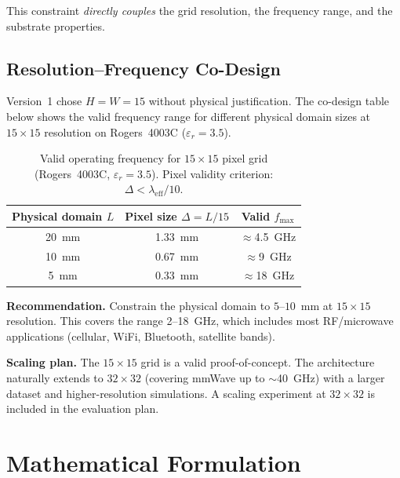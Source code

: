 \documentclass[12pt,a4paper]{article}
\newcommand{\NOTE}[1]{\begin{tcolorbox}[notebox]#1\end{tcolorbox}}
\theoremstyle{definition}
\theoremstyle{plain}
\theoremstyle{remark}
\begin{document}
This constraint \emph{directly couples} the grid resolution, the frequency range, and
the substrate properties.

\subsection{Resolution–Frequency Co-Design}
\label{sec:resfcodesign}

\begin{tcolorbox}[warnbox, title=V1 Gap — Now Resolved]
Version~1 chose $H = W = 15$ without physical justification.
The co-design table below shows the valid frequency range for different physical domain
sizes at $15\times15$ resolution on Rogers~4003C ($\varepsilon_r = 3.5$).
\end{tcolorbox}

\begin{table}[H]
\centering
\caption{Valid operating frequency for $15\!\times\!15$ pixel grid
         (Rogers~4003C, $\varepsilon_r=3.5$).
         Pixel validity criterion: $\Delta < \lambda_{\mathrm{eff}}/10$.}
\label{tab:res_freq}
\begin{tabular}{ccc}
\toprule
\textbf{Physical domain $L$} & \textbf{Pixel size $\Delta = L/15$} & \textbf{Valid $f_{\max}$} \\
\midrule
20~mm & 1.33~mm & $\approx$4.5~GHz \\
10~mm & 0.67~mm & $\approx$9~GHz   \\
 5~mm & 0.33~mm & $\approx$18~GHz  \\
\bottomrule
\end{tabular}
\end{table}

\textbf{Recommendation.}
Constrain the physical domain to $5$--$10$~mm at $15\times15$ resolution.
This covers the range 2--18~GHz, which includes most RF/microwave applications
(cellular, WiFi, Bluetooth, satellite bands).

\NOTE{\textbf{Scaling plan.}
The $15\times15$ grid is a valid proof-of-concept.
The architecture naturally extends to $32\times32$ (covering mmWave up to $\sim$40~GHz)
with a larger dataset and higher-resolution simulations.
A scaling experiment at $32\times32$ is included in the evaluation plan.}

\section{Mathematical Formulation}
\label{sec:math}
\end{document}
